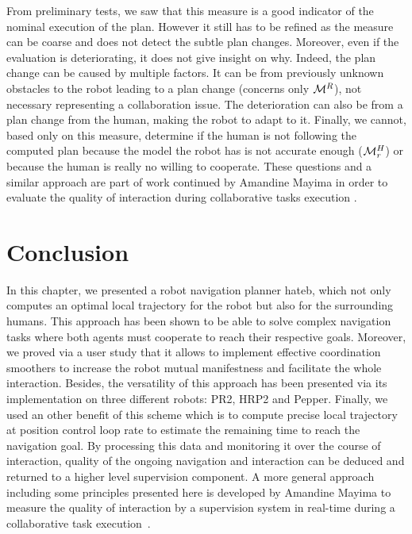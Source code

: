 \documentclass[a4paper,11pt,twoside]{StyleThese}
\begin{document}
From preliminary tests, we saw that this measure is a good indicator of the nominal execution of the plan. However it still has to be refined as the measure can be coarse and does not detect the subtle plan changes. Moreover, even if the evaluation is deteriorating, it does not give insight on why. Indeed, the plan change can be caused by multiple factors. It can be from previously unknown obstacles to the robot leading to a plan change (concerns only $\mathcal{M}^R$), not necessary representing a collaboration issue. The deterioration can also be from a plan change from the human, making the robot to adapt to it. Finally, we cannot, based only on this measure, determine if the human is not following the computed plan because the model the robot has is not accurate enough ($\mathcal{M}^H_r$) or because the human is really no willing to cooperate. These questions and a similar approach are part of work continued by Amandine Mayima in order to evaluate the quality of interaction during collaborative tasks execution \cite{mayima2020toward}.

\section{Conclusion}

In this chapter, we presented a robot navigation planner \acrshort{hateb}, which not only computes an optimal local trajectory for the robot but also for the surrounding humans. This approach has been shown to be able to solve complex navigation tasks where both agents must cooperate to reach their respective goals. Moreover, we proved via a user study that it allows to implement effective coordination smoothers to increase the robot mutual manifestness and facilitate the whole interaction.
Besides, the versatility of this approach has been presented via its implementation on three different robots: PR2, HRP2 and Pepper.
Finally, we used an other benefit of this scheme which is to compute precise local trajectory at position control loop rate to estimate the remaining time to reach the navigation goal. By processing this data and monitoring it over the course of interaction, quality of the ongoing navigation and interaction can be deduced and returned to a higher level supervision component. A more general approach including some principles presented here is developed by Amandine Mayima to measure the quality of interaction by a supervision system in real-time during a collaborative task execution~\cite{mayima2020toward}.
\end{document}

